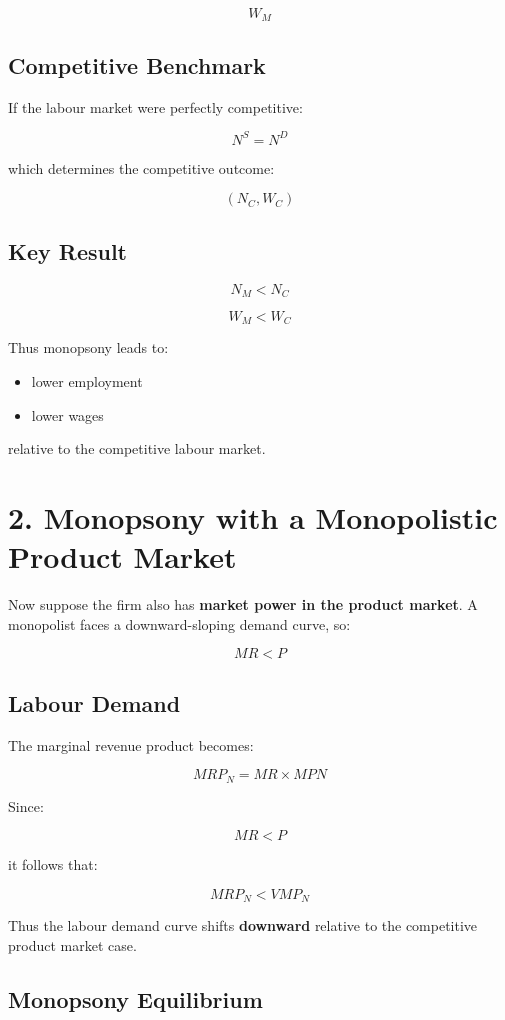 \documentclass[12pt]{article}
\begin{document}
\[
W_M
\]

\subsection*{Competitive Benchmark}

If the labour market were perfectly competitive:

\[
N^S = N^D
\]

which determines the competitive outcome:

\[
(N_C, W_C)
\]

\subsection*{Key Result}

\[
N_M < N_C
\]

\[
W_M < W_C
\]

Thus monopsony leads to:

\begin{itemize}
\item lower employment
\item lower wages
\end{itemize}

relative to the competitive labour market.

\section*{2. Monopsony with a Monopolistic Product Market}

Now suppose the firm also has \textbf{market power in the product market}. A monopolist faces a downward-sloping demand curve, so:

\[
MR < P
\]

\subsection*{Labour Demand}

The marginal revenue product becomes:

\[
MRP_N = MR \times MPN
\]

Since:

\[
MR < P
\]

it follows that:

\[
MRP_N < VMP_N
\]

Thus the labour demand curve shifts \textbf{downward} relative to the competitive product market case.

\subsection*{Monopsony Equilibrium}
\end{document}
